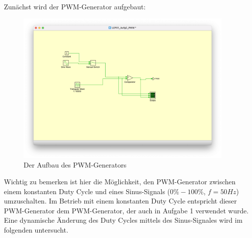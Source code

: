 \documentclass{report}
\begin{document}
Zunächst wird der PWM-Generator aufgebaut: 

\begin{figure}
  \begin{center}
    \includegraphics[width=0.95\textwidth]{assets/img/aufg2_aufbau_pwm.png}
  \end{center}
  \caption{Der Aufbau des PWM-Generators}
  \label{fig:aufg2_aufbau_pwm}
\end{figure}


Wichtig zu bemerken ist hier die Möglichkeit, den PWM-Generator zwischen einem konstanten Duty Cycle und eines Sinus-Signals ($0\% - 100\%$, $f=50Hz$) umzuschalten. Im Betrieb mit einem konstanten Duty Cycle entspricht dieser PWM-Generator dem PWM-Generator, der auch in Aufgabe 1 verwendet wurde. Eine dynamische Änderung des Duty Cycles mittels des Sinus-Signales wird im folgenden untersucht.
\end{document}
